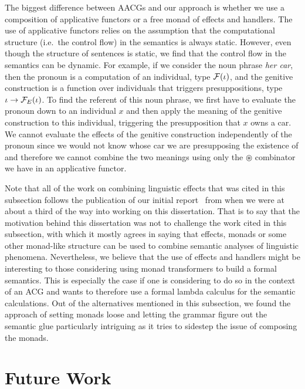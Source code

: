 \begin{itemize}
  The biggest difference between AACGs and our approach is whether we use a
  composition of applicative functors or a free monad of effects and
  handlers. The use of applicative functors relies on the assumption that
  the computational structure (i.e.\ the control flow) in the semantics is
  always static. However, even though the structure of sentences is static,
  we find that the control flow in the semantics can be dynamic. For
  example, if we consider the noun phrase \emph{her car}, then the pronoun
  is a computation of an individual, type $\mathcal{F}(\iota)$, and the genitive
  construction is a function over individuals that triggers
  presuppositions, type $\iota \to \mathcal{F}_E(\iota)$. To find the referent of
  this noun phrase, we first have to evaluate the pronoun down to an
  individual $x$ and then apply the meaning of the genitive construction to
  this individual, triggering the presupposition that $x$ owns a car. We
  cannot evaluate the effects of the genitive construction independently of
  the pronoun since we would not know whose car we are presupposing the
  existence of and therefore we cannot combine the two meanings using only
  the $\circledast$ combinator we have in an applicative functor.

\end{itemize}

Note that all of the work on combining linguistic effects that was cited in
this subsection follows the publication of our initial
report~\cite{marsik2014algebraic} from when we were at about a third of the
way into working on this dissertation. That is to say that the motivation
behind this dissertation was not to challenge the work cited in this
subsection, with which it mostly agrees in saying that effects, monads or
some other monad-like structure can be used to combine semantic analyses of
linguistic phenomena. Nevertheless, we believe that the use of effects and
handlers might be interesting to those considering using monad transformers
to build a formal semantics. This is especially the case if one is
considering to do so in the context of an ACG and wants to therefore use a
formal lambda calculus for the semantic calculations. Out of the
alternatives mentioned in this subsection, we found the approach of setting
monads loose and letting the grammar figure out the semantic glue
particularly intriguing as it tries to sidestep the issue of composing the
monads.


\section{Future Work}
\label{sec:future-work}


